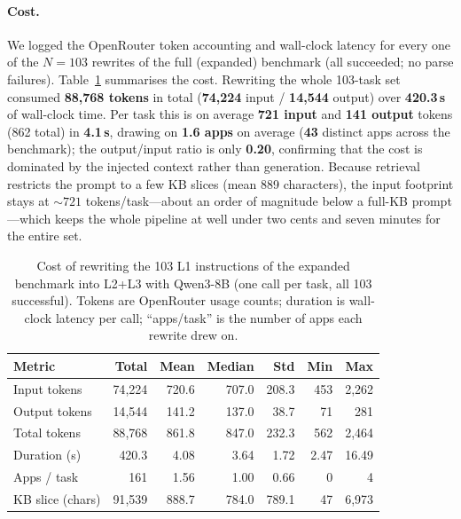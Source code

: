 \begin{tcolorbox}[breakable, colback=gray!4, colframe=gray!55,
  title={Listing~1: Instruction-rewrite prompt (verbatim).},
  fonttitle=\bfseries, label={lst:rewrite-prompt}]
\end{tcolorbox}

\paragraph{Cost.}
We logged the OpenRouter token accounting and wall-clock latency for every one
of the $N=103$ rewrites of the full (expanded) benchmark (all succeeded; no
parse failures). Table~\ref{tab:rewrite-cost} summarises the cost. Rewriting the
whole 103-task set consumed \textbf{88{,}768 tokens} in total
(\textbf{74{,}224} input / \textbf{14{,}544} output) over \textbf{420.3\,s} of
wall-clock time. Per task this is on average \textbf{721 input} and
\textbf{141 output} tokens (862 total) in \textbf{4.1\,s}, drawing on
\textbf{1.6 apps} on average (\textbf{43} distinct apps across the benchmark);
the output/input ratio is only \textbf{0.20}, confirming that the cost is
dominated by the injected context rather than generation. Because retrieval
restricts the prompt to a few KB slices (mean 889 characters), the input
footprint stays at $\sim\!721$ tokens/task---about an order of magnitude below a
full-KB prompt---which keeps the whole pipeline at well under two cents and
seven minutes for the entire set.

\begin{table}[t]
\centering
\caption{Cost of rewriting the 103 L1 instructions of the expanded benchmark
into L2+L3 with Qwen3-8B (one call per task, all 103 successful). Tokens are
OpenRouter usage counts; duration is wall-clock latency per call; ``apps/task''
is the number of apps each rewrite drew on.}
\label{tab:rewrite-cost}
\small
\begin{tabular}{lrrrrrr}
\toprule
Metric & Total & Mean & Median & Std & Min & Max \\
\midrule
Input tokens      & 74{,}224 & 720.6 & 707.0 & 208.3 & 453 & 2{,}262 \\
Output tokens     & 14{,}544 & 141.2 & 137.0 &  38.7 &  71 &   281 \\
Total tokens      & 88{,}768 & 861.8 & 847.0 & 232.3 & 562 & 2{,}464 \\
Duration (s)      &   420.3  &   4.08 &  3.64 &  1.72 & 2.47 & 16.49 \\
Apps / task       &     161  &   1.56 &  1.00 &  0.66 &   0 &     4 \\
KB slice (chars)  & 91{,}539 & 888.7 & 784.0 & 789.1 &  47 & 6{,}973 \\
\bottomrule
\end{tabular}
\end{table}


